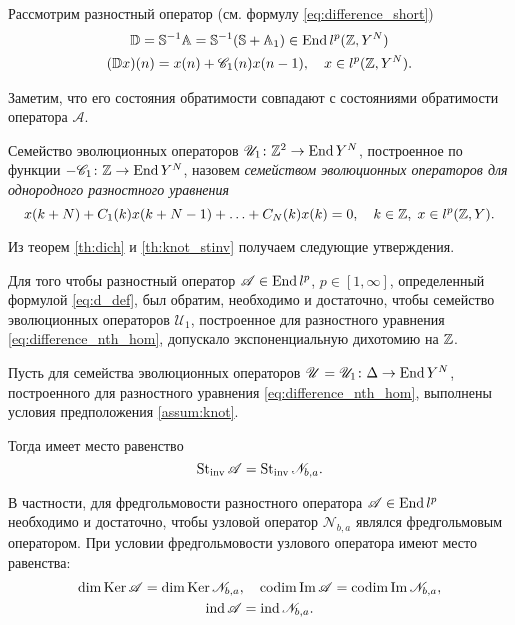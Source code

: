 Рассмотрим разностный оператор (см. формулу \eqref{eq:difference_short})
\begin{gather*}
\mathbb D = \mathbb S^{-1} \mathbb A = \mathbb S^{-1}(\mathbb S + \mathbb A_1) \in \operatorname{End}{l^p(\mathbb{Z}, Y^N)}\\
(\mathbb D x)(n) = x(n) + \mathcal C_1(n) x(n-1), \quad x \in l^p(\mathbb{Z}, Y^N).
\end{gather*}

Заметим, что его состояния обратимости совпадают с состояниями обратимости оператора $\mathcal A$.

\begin{definition}
    Семейство эволюционных операторов $\mathcal U_1 \colon \mathbb{Z}^2 \to \operatorname{End}{Y^N}$, построенное по функции $-\mathcal C_1 \colon \mathbb{Z} \to \operatorname{End}{Y^N}$, назовем \emph{семейством эволюционных операторов для однородного разностного уравнения}
    \begin{equation}\label{eq:difference_nth_hom}
        x(k + N) + C_1(k) x(k + N - 1) + \dotsc + C_{N}(k) x(k) = 0, \quad k \in \mathbb{Z}, \; x \in l^p(\mathbb{Z}, Y).
    \end{equation}
\end{definition}

Из теорем \ref{th:dich} и \ref{th:knot_stinv} получаем следующие утверждения.

\begin{theorem}
    Для того чтобы разностный оператор $\mathcal A\in \operatorname{End}{l^p}$, $p \in [1, \infty]$, определенный формулой \eqref{eq:d_def}, был обратим, необходимо и достаточно, чтобы семейство эволюционных операторов $\mathcal U_1$, построенное для разностного уравнения \eqref{eq:difference_nth_hom}, допускало экспоненциальную дихотомию на $\mathbb{Z}$.
\end{theorem}

\begin{theorem}\label{th:fredholm_difference}
    Пусть для семейства эволюционных операторов $\mathcal U = \mathcal U_1\colon \Delta \to \operatorname{End} Y^N$, построенного для разностного уравнения \eqref{eq:difference_nth_hom}, выполнены условия предположения \ref{assum:knot}.

    Тогда имеет место равенство
    \[ \operatorname{St_{inv}}{\mathcal A} = \operatorname{St_{inv}}{\mathcal N_{b, a}}.\]

    В частности, для фредгольмовости разностного оператора $\mathcal A\in \operatorname{End}{l^p}$ необходимо и достаточно, чтобы узловой оператор $\mathcal N_{b, a}$ являлся фредгольмовым оператором. При условии фредгольмовости узлового оператора имеют место равенства:
    \begin{gather*}
        \dim \operatorname{Ker} \mathcal A = \dim \operatorname{Ker} \mathcal N_{b, a}, \quad
        \operatorname{codim} \operatorname{Im} \mathcal A = \operatorname{codim} \operatorname{Im} \mathcal N_{b, a}, \\
        \operatorname{ind} \mathcal A = \operatorname{ind} \mathcal N_{b, a}.
    \end{gather*}
\end{theorem}

